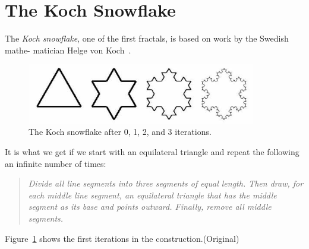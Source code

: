 \documentclass[12pt,a4paper]{article}
\begin{document}
\section{The Koch Snowflake}

The \emph{Koch snowflake},
one of the first fractals, is based on work by the Swedish mathe-
matician Helge von Koch~\cite{koch}.
\begin{figure}[h]
	\centering
	\includegraphics[width=10cm]{snowflake.jpg}
	\begin{minipage}{\textwidth}
		\hspace{-1cm}
		\caption{The Koch snowflake after 0, 1, 2, and 3 iterations.}
	\end{minipage}
	\label{koch}
\end{figure}
It is what we get if we start with an equilateral triangle    and repeat the following an infinite number of times:
\begin{quote}
\textit{Divide all line segments into three segments of equal length. Then draw, for each middle line segment, an equilateral triangle that has the middle segment as its base and points outward. Finally, remove all middle segments.}
\end{quote}
\begin{adjustwidth}{0cm}{-2cm}
Figure~\ref{koch} shows the first iterations in the construction.\hfill(Original)
\end{adjustwidth}
\end{document}
